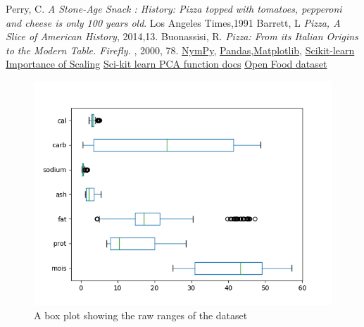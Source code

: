 \documentclass[preprint,12pt]{elsarticle}
\begin{document}

\begin{thebibliography}{00}
 Perry, C. {\em A Stone-Age Snack : History: Pizza topped with tomatoes, pepperoni and cheese is only 100 years old}. Los Angeles Times,1991
 Barrett, L  {\em Pizza, A Slice of American History}, 2014,13.
 Buonassisi, R. {\em Pizza: From its Italian Origins to the Modern Table. Firefly.} , 2000, 78.
 \href{https://numpy.org/}{NymPy}, \href{https://pandas.pydata.org/}{Pandas},\href{https://matplotlib.org/}{Matplotlib}, \href{https://scikit-learn.org/stable/index.html}{Scikit-learn}
 \href{https://scikit-learn.org/stable/auto_examples/preprocessing/plot_scaling_importance.html}{Importance of Scaling}
 \href{https://scikit-learn.org/stable/modules/generated/sklearn.decomposition.PCA.html}{Sci-kit learn PCA function docs}
 \href{https://world.openfoodfacts.org/data}{Open Food dataset}
\end{thebibliography}


\begin{figure}[b]
	\centering
    \centerline{\includegraphics[scale=0.6]{figs/raw_boxplot.png}}
    \caption{A box plot showing the raw ranges of the dataset}\label{fig:raw_boxplot}
\end{figure}
\end{document}
